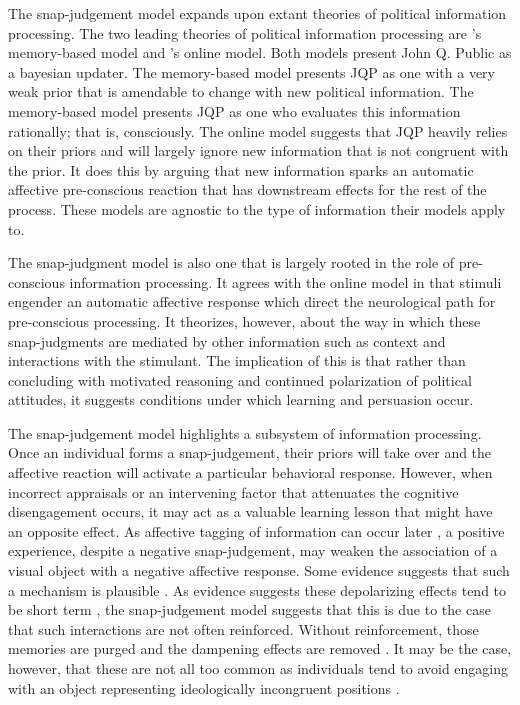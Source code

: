 \documentclass [12pt]{article}
\begin{document}
The snap-judgement model expands upon extant theories of political information processing. The two leading theories of political information processing are \citeauthor{zaller_1992}'s \citeyearpar{zaller_1992} memory-based model and \citeauthor{lodge_taber_2013_cup}'s \citeyearpar{lodge_taber_2013_cup} online model. Both models present John Q. Public as a bayesian updater. The memory-based model presents JQP as one with a very weak prior that is amendable to change with new political information. The memory-based model presents JQP as one who evaluates this information rationally; that is, consciously. The online model suggests that JQP heavily relies on their priors and will largely ignore new information that is not congruent with the prior. It does this by arguing that new information sparks an automatic affective pre-conscious reaction that has downstream effects for the rest of the process. These models are agnostic to the type of information their models apply to.

The snap-judgment model is also one that is largely rooted in the role of pre-conscious information processing. It agrees with the online model in that stimuli engender an automatic affective response which direct the neurological path for pre-conscious processing. It theorizes, however, about the way in which these snap-judgments are mediated by other information such as context and interactions with the stimulant. The implication of this is that rather than concluding with motivated reasoning and continued polarization of political attitudes, it suggests conditions under which learning and persuasion occur.

The snap-judgement model highlights a subsystem of information processing. Once an individual forms a snap-judgement, their priors will take over and the affective reaction will activate a particular behavioral response. However, when incorrect appraisals or an intervening factor that attenuates the cognitive disengagement occurs, it may act as a valuable learning lesson that might have an opposite effect. As affective tagging of information can occur later \citep{kensinger_fields_2022_ohhum}, a positive experience, despite a negative snap-judgement, may weaken the association of a visual object with a negative affective response. Some evidence suggests that such a mechanism is plausible \citep{santoro_broockman_2022_sa}. As evidence suggests these depolarizing effects tend to be short term \citep{santoro_broockman_2022_sa}, the snap-judgement model suggests that this is due to the case that such interactions are not often reinforced. Without reinforcement, those memories are purged and the dampening effects are removed \citep[see][]{kahana_et-al_2022_ohhum}. It may be the case, however, that these are not all too common as individuals tend to avoid engaging with an object representing ideologically incongruent positions \citep[see][]{mutz_2006, klar_krupnikov_2016}.
\end{document}
